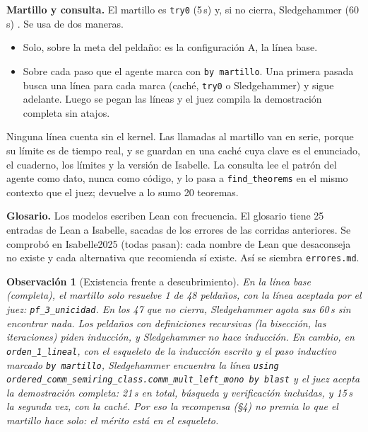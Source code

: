 \documentclass[11pt,a4paper]{article}
\newtheorem{remark}{Observación}
\begin{document}
\textbf{Martillo y consulta.} El martillo es \texttt{try0} (5\,s) y, si no cierra, Sledgehammer (60\,s) \citep{PaulsonBlanchette2010}. Se usa de dos maneras.
\begin{itemize}
  \item Solo, sobre la meta del peldaño: es la configuración A, la línea base.
  \item Sobre cada paso que el agente marca con \texttt{by martillo}. Una primera pasada busca una línea para cada marca (caché, \texttt{try0} o Sledgehammer) y sigue adelante. Luego se pegan las líneas y el juez compila la demostración completa sin atajos.
\end{itemize}
Ninguna línea cuenta sin el kernel. Las llamadas al martillo van en serie, porque su límite es de tiempo real, y se guardan en una caché cuya clave es el enunciado, el cuaderno, los límites y la versión de Isabelle. La consulta lee el patrón del agente como dato, nunca como código, y lo pasa a \texttt{find\_theorems} en el mismo contexto que el juez; devuelve a lo sumo 20 teoremas.

\textbf{Glosario.} Los modelos escriben Lean con frecuencia. El glosario tiene 25 entradas de Lean a Isabelle, sacadas de los errores de las corridas anteriores. Se comprobó en Isabelle2025 (todas pasan): cada nombre de Lean que desaconseja no existe y cada alternativa que recomienda sí existe. Así se siembra \texttt{errores.md}.

\begin{remark}[Existencia frente a descubrimiento]\label{obs:existencia}
En la línea base (completa), el martillo solo resuelve 1 de 48 peldaños, con la línea aceptada por el juez: \texttt{pf\_\allowbreak{}3\_\allowbreak{}unicidad}. En los 47 que no cierra, Sledgehammer agota sus 60\,s sin encontrar nada. Los peldaños con definiciones recursivas (la bisección, las iteraciones) piden inducción, y Sledgehammer no hace inducción. En cambio, en \texttt{orden\_\allowbreak{}1\_\allowbreak{}lineal}, con el esqueleto de la inducción escrito y el paso inductivo marcado \texttt{by martillo}, Sledgehammer encuentra la línea \texttt{using ordered\_\allowbreak{}comm\_\allowbreak{}semiring\_\allowbreak{}class.comm\_\allowbreak{}mult\_\allowbreak{}left\_\allowbreak{}mono by blast} y el juez acepta la demostración completa: 21\,s en total, búsqueda y verificación incluidas, y 15\,s la segunda vez, con la caché. Por eso la recompensa (§4) no premia lo que el martillo hace solo: el mérito está en el esqueleto.
\end{remark}
\end{document}
